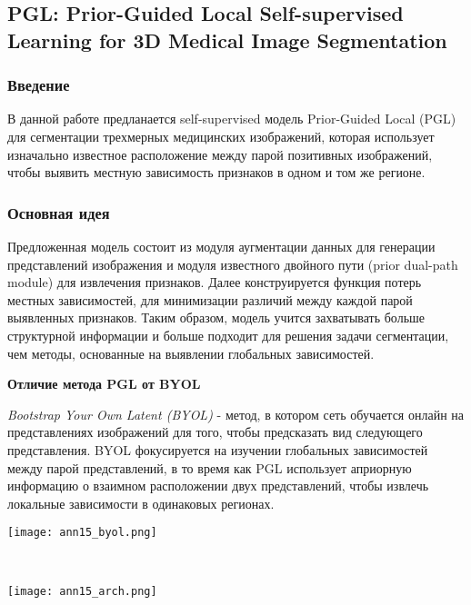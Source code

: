 \subsection*{PGL: Prior-Guided Local Self-supervised Learning
for 3D Medical Image Segmentation}

\subsubsection*{Введение}
В данной работе \cite{ann15} предланается self-supervised модель Prior-Guided Local (PGL) 
для сегментации трехмерных медицинских изображений, которая использует изначально
известное расположение между парой позитивных изображений, чтобы выявить местную 
зависимость признаков в одном и том же регионе.
\subsubsection*{Основная идея}
Предложенная модель состоит из модуля аугментации данных для генерации 
представлений изображения и модуля известного двойного пути (prior dual-path module)
для извлечения признаков. Далее конструируется функция потерь местных зависимостей, 
для минимизации различий между каждой парой выявленных признаков. Таким образом, модель
учится захватывать больше структурной информации и больше подходит для решения задачи сегментации, 
чем методы, основанные на выявлении глобальных зависимостей. 
\par 
\textbf{Отличие метода PGL от BYOL} \par
\textit{Bootstrap Your Own Latent (BYOL)} - метод, в котором сеть 
обучается онлайн на представлениях изображений для того, чтобы предсказать вид
следующего представления. BYOL фокусируется на изучении глобальных зависимостей между 
парой представлений, в то время как PGL использует априорную информацию о
взаимном расположении двух представлений, чтобы извлечь локальные зависимости в одинаковых регионах.




\begin{minipage}{1.0\linewidth}
    \begin{center}
        \texttt{[image: ann15\_byol.png]} \\
    \end{center}
\end{minipage}
\\
\begin{minipage}{1.0\linewidth}
    \begin{center}
        \texttt{[image: ann15\_arch.png]} \\
    \end{center}
\end{minipage}

